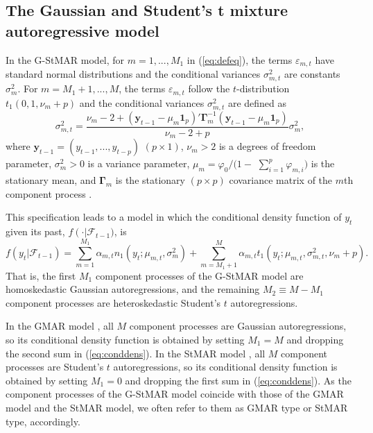 \documentclass[nojss]{jss} %
\begin{document}
\subsection{The Gaussian and Student's t mixture autoregressive model}\label{sec:gstmar}

In the G-StMAR model, for $m=1,...,M_1$ in (\ref{eq:defeq}), the terms $\varepsilon_{m,t}$ have standard normal distributions and the conditional variances $\sigma_{m,t}^2$ are constants $\sigma_m^2$. For $m=M_1+1,...,M$, the terms $\varepsilon_{m,t}$ follow the $t$-distribution $t_1(0,1,\nu_m+p)$ and the conditional variances $\sigma_{m,t}^2$ are defined as
%
\begin{equation}\label{eq:sigmamt}
\sigma_{m,t}^2=\frac{\nu_m-2+(\boldsymbol{y}_{t-1}-\mu_m\mathbf{1}_p)'\boldsymbol{\Gamma}_m^{-1}(\boldsymbol{y}_{t-1}-\mu_m\mathbf{1}_p)}{\nu_m-2+p}\sigma_m^2,
\end{equation}
%
where $\boldsymbol{y}_{t-1}=(y_{t-1},...,y_{t-p})$ $(p \times 1)$, $\nu_m>2$ is a degrees of freedom parameter, $\sigma_m^2>0$ is a variance parameter, $\mu_m=\varphi_0/ (1-$ $\sum_{i=1}^p\varphi_{m,i})$ is the stationary mean, and $\boldsymbol{\Gamma}_m$ is the stationary $(p\times p)$ covariance matrix of the $m$th component process \cite[see][Section 2.1]{Virolainen:2020}.

This specification leads to a model in which the conditional density function of $y_t$ given its past, $f\left(\cdot \right | \mathcal{F}_{t-1})$, is
%
\begin{equation}\label{eq:conddens}
f\left(y_t |\mathcal{F}_{t-1}\right)=\sum_{m=1}^{M_1}\alpha_{m,t}n_1(y_t;\mu_{m,t},\sigma_m^2)+\sum_{m=M_1+1}^{M}\alpha_{m,t} t_1\left(y_t;\mu_{m,t},\sigma_{m,t}^2,\nu_m+p\right).
\end{equation}
%
That is, the first $M_1$ component processes of the G-StMAR model are homoskedastic Gaussian autoregressions, and the remaining $M_2\equiv M - M_1$ component processes are heteroskedastic Student's $t$ autoregressions.

In the GMAR model \citep{Kalliovirta+Meitz+Saikkonen:2015}, all $M$ component processes are Gaussian autoregressions, so its conditional density function is obtained by setting $M_1=M$ and dropping the second sum in (\ref{eq:conddens}). In the StMAR model \citep{Meitz+Preve+Saikkonen:2021}, all $M$ component processes are Student's $t$ autoregressions, so its conditional density function is obtained by setting $M_1=0$ and dropping the first sum in (\ref{eq:conddens}). As the component processes of the G-StMAR model coincide with those of the GMAR model and the StMAR model, we often refer to them as GMAR type or StMAR type, accordingly.
\end{document}
